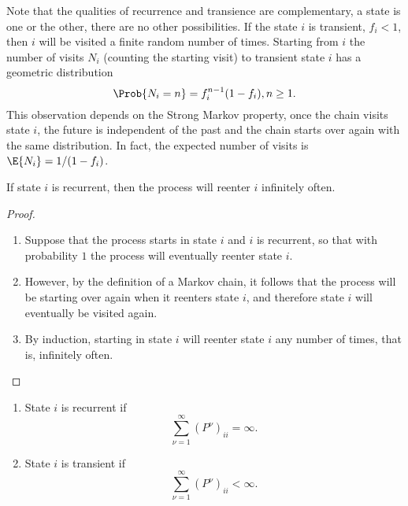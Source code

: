 \documentclass[12pt]{article}
\begin{document}
\begin{remark}
    Note that the qualities of recurrence and transience are
    complementary, a state is one or the other, there are no other
    possibilities.  If the state \( i \) is transient, \( f_i < 1 \),
    then \( i \) will be visited a finite random number of times.
    Starting from \( i \) the number of visits \( N_i \) (counting the
    starting visit) to transient state \( i \) has a geometric
    distribution
    \[
        \Prob{N_i = n} = f_i^{n-1}(1 - f_i), n \ge 1.
    \] This observation depends on the Strong Markov property, once the
    chain visits state \( i \), the future is independent of the past
    and the chain starts over again with the same distribution.  In
    fact, the expected number of visits is \( \E{N_i} = 1/(1 - f_i) \).
\end{remark}

\begin{proposition}
    If state \( i \) is recurrent, then the process will reenter \( i \)
    infinitely often.
\end{proposition}

\begin{proof}
    \begin{enumerate}
        \item
            Suppose that the process starts in state \( i \) and \( i \)
            is recurrent, so that with probability \( 1 \) the process
            will eventually reenter state \( i \).
        \item
            However, by the definition of a Markov chain, it follows
            that the process will be starting over again when it
            reenters state \( i \), and therefore state \( i \) will
            eventually be visited again.
        \item
            By induction, starting in state \( i \) will reenter state \(
            i \) any number of times, that is, infinitely often.
    \end{enumerate}
\end{proof}

\begin{proposition}
    \begin{enumerate}
        \item
            State \( i \) is recurrent if
            \[
                \sum\limits_{\nu=1}^{\infty} (P^{\nu})_{ii} = \infty.
            \]
        \item
            State \( i \) is transient if
            \[
                \sum\limits_{\nu=1}^{\infty} (P^\nu)_{ii} < \infty.
            \]
    \end{enumerate}
\end{proposition}
\end{document}
